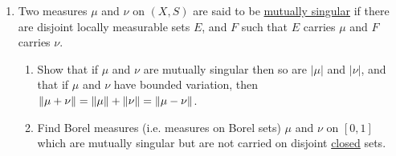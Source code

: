 \begin{enumerate}[label=\arabic*)]
\item Two measures $\mu$ and $\nu$ on $(X, S)$ are said to be \underline{mutually singular} if there are disjoint locally measurable sets $E$, and $F$ such that $E$ carries $\mu$ and $F$ carries $\nu$.
\begin{enumerate}
\item Show that if $\mu$ and $\nu$ are mutually singular then so are $|\mu|$ and $|\nu|$, and that if $\mu$ and $\nu$ have bounded variation, then $\norm{\mu+\nu}=\norm{\mu}+\norm{\nu}=\norm{\mu-\nu}$.
\item Find Borel measures (i.e. measures on Borel sets) $\mu$ and $\nu$ on $[0,1]$ which are mutually singular but are not carried on disjoint \underline{closed} sets.
\end{enumerate}
\end{enumerate}